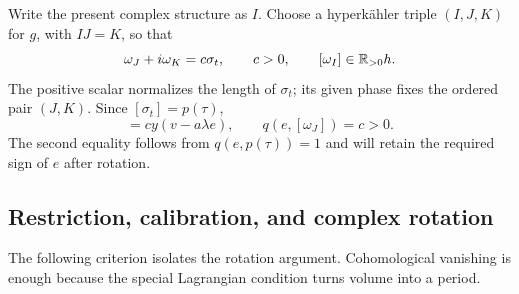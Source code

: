 Write the present complex structure as $I$.  Choose a hyperk\"ahler
triple $(I,J,K)$ for $g$, with $IJ=K$, so that
\begin{equation}
       \omega_J+i\omega_K=c\sigma_t,\qquad c>0,
       \qquad [\omega_I]\in\mathbb R_{>0}h.
\label{eq:rotation-normalization}
\end{equation}
The positive scalar normalizes the length of $\sigma_t$; its given
phase fixes the ordered pair $(J,K)$.  Since $[\sigma_t]=p(\tau)$,
\begin{equation}
 [\omega_K]=cy(v-a\lambda e),\qquad
 q(e,[\omega_J])=c>0.
\label{eq:rotation-k-class}
\end{equation}
The second equality follows from $q(e,p(\tau))=1$ and will retain
the required sign of $e$ after rotation.

\subsection{Restriction, calibration, and complex rotation}

The following criterion isolates the rotation argument. Cohomological
vanishing is enough because the special Lagrangian condition turns
volume into a period.

